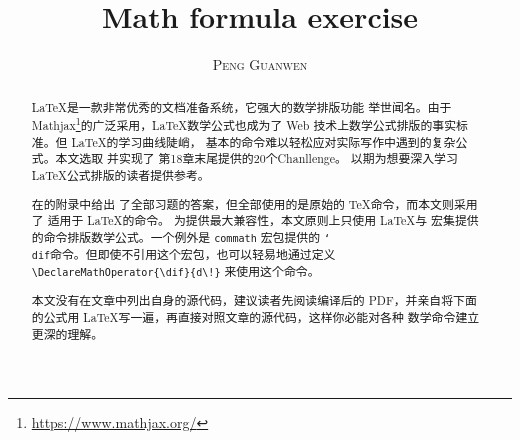 \documentclass[UTF8,a4paper,scheme=plain,%
punct=quanjiao]{ctexart}
\title{Math formula exercise}
\author{\textsc{Peng Guanwen}}
\newcommand*{\cmd}[1]{\texttt{\char`\\#1}}
\begin{document}
\maketitle

\begin{abstract}
\LaTeX 是一款非常优秀的文档准备系统，它强大的数学排版功能
举世闻名。由于 Mathjax\footnote{\url{https://www.mathjax.org/}}的广泛采用，\LaTeX 数学公式也成为了
Web 技术上数学公式排版的事实标准。但 \LaTeX 的学习曲线陡峭，
基本的命令难以轻松应对实际写作中遇到的复杂公式。本文选取
并实现了 第18章末尾提供的20个Chanllenge。
以期为想要深入学习 \LaTeX 公式排版的读者提供参考。

\citeauthor{TeXbook}在的附录中给出
了全部习题的答案，但全部使用的是原始的 \TeX 命令，而本文则采用了
适用于 \LaTeX 的命令。
为提供最大兼容性，本文原则上只使用 \LaTeX 与 \AmS 宏集提供
的命令排版数学公式。一个例外是 \texttt{commath} 宏包提供的
\cmd{dif}命令。但即使不引用这个宏包，也可以轻易地通过定义
\verb|\DeclareMathOperator{\dif}{d\!}|
来使用这个命令。

本文没有在文章中列出自身的源代码，建议读者先阅读编译后的
PDF，并亲自将下面的公式用
\LaTeX 写一遍，再直接对照文章的源代码，这样你必能对各种
数学命令建立更深的理解。

\end{abstract}
\end{document}
